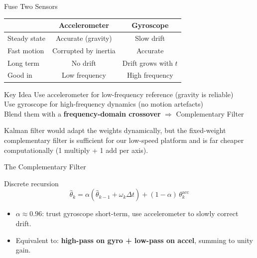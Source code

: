 \documentclass[10pt]{beamer}
\begin{document}
\begin{frame}{Fuse Two Sensors}
  \begin{center}
  \footnotesize
  \begin{tabular}{lcc}
    \toprule
     & \textbf{Accelerometer} & \textbf{Gyroscope} \\
    \midrule
    Steady state & Accurate (gravity) & Slow drift \\
    Fast motion & Corrupted by inertia & Accurate \\
    Long term & No drift & Drift grows with $t$ \\
    \midrule
    Good in & Low frequency & High frequency \\
    \bottomrule
  \end{tabular}
  \end{center}

  \begin{block}{Key Idea}
    Use accelerometer for low-frequency reference (gravity is reliable)\\
    Use gyroscope for high-frequency dynamics (no motion artefacts)\\
    Blend them with a \textbf{frequency-domain crossover} $\Rightarrow$ Complementary Filter
  \end{block}

  \scriptsize
  Kalman filter would adapt the weights dynamically, but the fixed-weight complementary filter is sufficient for our low-speed platform and is far cheaper computationally (1 multiply + 1 add per axis).
\end{frame}


\begin{frame}{The Complementary Filter}
  \begin{block}{Discrete recursion}
    \[
      \boxed{\;
      \hat{\theta}_k = \alpha\!\left(\hat{\theta}_{k-1} + \omega_k \Delta t\right) + (1 - \alpha)\,\theta_k^{\text{acc}}
      \;}
    \]
  \end{block}

  \begin{itemize}
    \item $\alpha \approx 0.96$: trust gyroscope short-term, use accelerometer to slowly correct drift.
    \item Equivalent to: \textbf{high-pass on gyro + low-pass on accel}, summing to unity gain.
  \end{itemize}


\end{frame}
\end{document}
